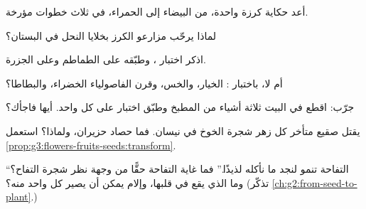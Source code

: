 \begin{exercise}[$\star$]\label{exo:g3:flowers-fruits-seeds:4}
أعد حكاية كرزة واحدة، من  البيضاء إلى  الحمراء، في
ثلاث خطوات مؤرخة.
\end{exercise}

\begin{exercise}[$\star$]\label{exo:g3:flowers-fruits-seeds:5}
لماذا يرحّب مزارعو الكرز بخلايا النحل في البستان؟
\end{exercise}

\begin{exercise}[$\star$]\label{exo:g3:flowers-fruits-seeds:6}
اذكر اختبار ، وطبّقه على الطماطم وعلى الجزرة.
\end{exercise}

\begin{exercise}[$\star$]\label{exo:g3:flowers-fruits-seeds:7}
 أم لا، باختبار : الخيار، والخس، وقرن الفاصولياء
الخضراء، والبطاطا؟
\end{exercise}

\begin{exercise}[$\star$]\label{exo:g3:flowers-fruits-seeds:8}
جرّب: اقطع في البيت ثلاثة أشياء من المطبخ وطبّق اختبار  على
كل واحد. أيها فاجأك؟
\end{exercise}

\begin{exercise}[$\star\star$]\label{exo:g3:flowers-fruits-seeds:9}
يقتل صقيع متأخر كل زهر شجرة الخوخ في نيسان. فما حصاد حزيران،
ولماذا؟ استعمل \cref{prop:g3:flowers-fruits-seeds:transform}.
\end{exercise}

\begin{exercise}[$\star\star$]\label{exo:g3:flowers-fruits-seeds:10}
``التفاحة تنمو لنجد ما نأكله لذيذًا.'' فما غاية التفاحة حقًّا من
وجهة نظر شجرة التفاح؟ وما الذي يقع في قلبها، وإلام يمكن أن يصير كل
واحد منه؟ (تذكّر \cref{ch:g2:from-seed-to-plant}.)
\end{exercise}

